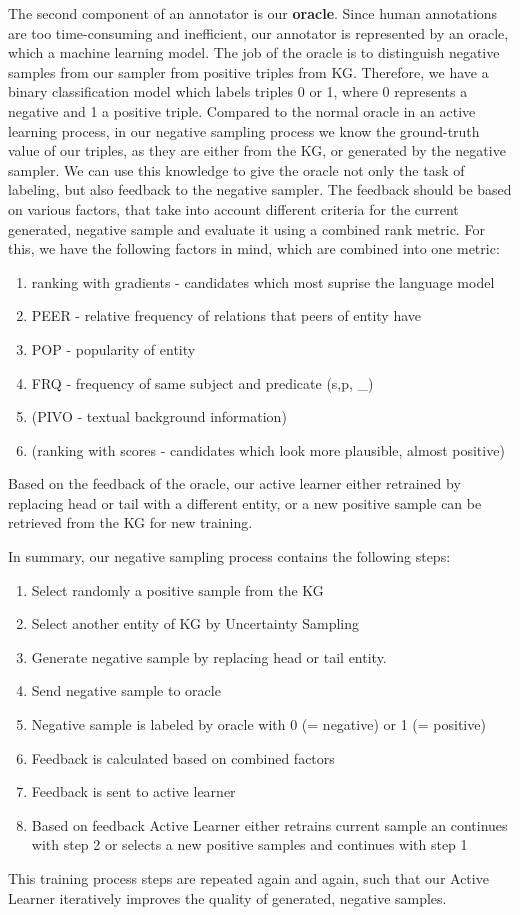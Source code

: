 The second component of an annotator is our \textbf{oracle}. 
Since human annotations are too time-consuming and inefficient, our annotator is represented by an oracle, which a machine learning model.
The job of the oracle is to distinguish negative samples from our sampler from positive triples from \ac{KG}. 
Therefore, we have a binary classification model which labels triples 0 or 1, where 0 represents a negative and 1 a positive triple.
Compared to the normal oracle in an active learning process, in our negative sampling process we know the ground-truth value of our triples, as they are either from the KG, or generated by the negative sampler.
We can use this knowledge to give the oracle not only the task of labeling, but also feedback to the negative sampler.
The feedback should be based on various factors, that take into account different criteria for the current generated, negative sample and evaluate it using a combined rank metric.
For this, we have the following factors in mind, which are combined into one metric:
\begin{enumerate}
    \item ranking with gradients - candidates which most suprise the language model
    \item PEER - relative frequency of relations that peers of entity have
    \item POP - popularity of entity
    \item FRQ - frequency of same subject and predicate (s,p, \_)
    \item (PIVO - textual background information)
    \item (ranking with scores - candidates which look more plausible, almost positive)
\end{enumerate}
Based on the feedback of the oracle, our active learner either retrained by replacing head or tail with a different entity, or a new positive sample can be retrieved from the \ac{KG} for new training.

In summary, our negative sampling process contains the following steps:
\begin{enumerate}
    \item Select randomly a positive sample from the KG
    \item Select another entity of KG by Uncertainty Sampling
    \item Generate negative sample by replacing head or tail entity.
    \item Send negative sample to oracle
    \item Negative sample is labeled by oracle with 0 (= negative) or 1 (= positive)
    \item Feedback is calculated based on combined factors
    \item Feedback is sent to active learner
    \item Based on feedback Active Learner either retrains current sample an continues with step 2 or selects a new positive samples and continues with step 1
\end{enumerate}
This training process steps are repeated again and again, such that our Active Learner iteratively improves the quality of generated, negative samples. 


